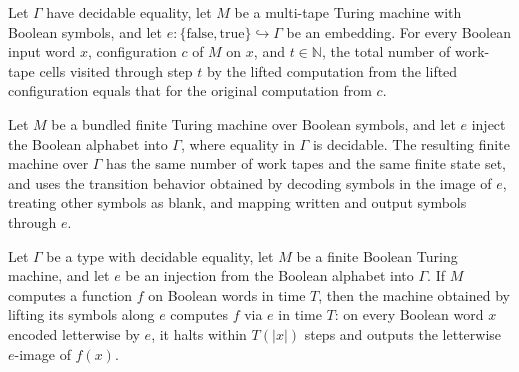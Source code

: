 \begin{lemma}
\label{Turing.MultiTapeTM.liftSymbols_spaceUsed}
\leanok
{}
Let $\Gamma$ have decidable equality, let $M$ be a multi-tape Turing machine with
Boolean symbols, and let $e:\{\mathrm{false},\mathrm{true}\}\hookrightarrow\Gamma$ be an
embedding. For every Boolean input word $x$, configuration $c$ of $M$ on $x$, and
$t\in\mathbb{N}$, the total number of work-tape cells visited through step $t$ by the
lifted computation from the lifted configuration equals that for the original
computation from $c$.
\end{lemma}

\begin{definition}
\label{Turing.FinTM.liftSymbols}
\leanok
{}
Let $M$ be a bundled finite Turing machine over Boolean symbols, and let $e$ inject the
Boolean alphabet into $\Gamma$, where equality in $\Gamma$ is decidable. The resulting
finite machine over $\Gamma$ has the same number of work tapes and the same finite state
set, and uses the transition behavior obtained by decoding symbols in the image of $e$,
treating other symbols as blank, and mapping written and output symbols through $e$.
\end{definition}

\begin{theorem}
\label{Turing.FinTM.liftSymbols_computesFunInTimeVia}
\leanok
{}
Let $\Gamma$ be a type with decidable equality, let $M$ be a finite Boolean Turing
machine, and let $e$ be an injection from the Boolean alphabet into $\Gamma$. If $M$
computes a function $f$ on Boolean words in time $T$, then the machine obtained by
lifting its symbols along $e$ computes $f$ via $e$ in time $T$: on every Boolean word
$x$ encoded letterwise by $e$, it halts within $T(|x|)$ steps and outputs the letterwise
$e$-image of $f(x)$.
\end{theorem}

